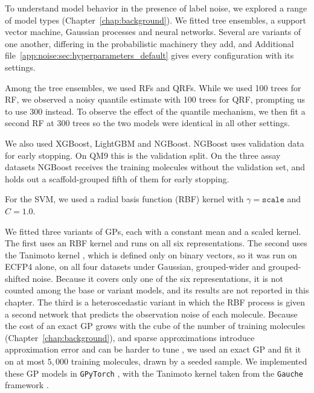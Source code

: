 To understand model behavior in the presence of label noise, we explored a range of model types (Chapter~\ref{chap:background}). We fitted tree ensembles, a support vector machine, Gaussian processes and neural networks. Several are variants of one another, differing in the probabilistic machinery they add, and Additional file~\ref{app:noise:sec:hyperparameters_default} gives every configuration with its settings.

Among the tree ensembles, we used RFs and QRFs. While we used 100 trees for RF, we observed a noisy quantile estimate with 100 trees for QRF, prompting us to use 300 instead. To observe the effect of the quantile mechanism, we then fit a second RF at 300 trees so the two models were identical in all other settings.

We also used XGBoost, LightGBM and NGBoost. NGBoost uses validation data for early stopping. On QM9 this is the validation split. On the three assay datasets NGBoost receives the training molecules without the validation set, and holds out a scaffold-grouped fifth of them for early stopping.

For the SVM, we used a radial basis function (RBF) kernel with $\gamma = \texttt{scale}$ and $C = 1.0$.

We fitted three variants of GPs, each with a constant mean and a scaled kernel. The first uses an RBF kernel and runs on all six representations. The second uses the Tanimoto kernel \citep{Ralaivola2005, moss2020}, which is defined only on binary vectors, so it was run on ECFP4 alone, on all four datasets under Gaussian, grouped-wider and grouped-shifted noise. Because it covers only one of the six representations, it is not counted among the base or variant models, and its results are not reported in this chapter. The third is a heteroscedastic variant in which the RBF process is given a second network that predicts the observation noise of each molecule. Because the cost of an exact GP grows with the cube of the number of training molecules (Chapter~\ref{chap:background}), and sparse approximations introduce approximation error and can be harder to tune \citep{quinonero2005}, we used an exact GP and fit it on at most $5{,}000$ training molecules, drawn by a seeded sample. We implemented these GP models in \texttt{GPyTorch} \citep{gpytorch}, with the Tanimoto kernel taken from the \texttt{Gauche} framework \citep{gauche}.


